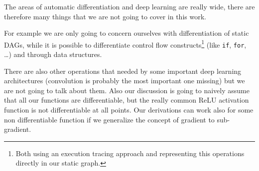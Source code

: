 \documentclass{sapthesis}
\begin{document}
The areas of automatic differentiation and deep learning are really wide, there
are therefore many things that we are not going to cover in this work.

For example we are only going to concern ourselves with differentiation of
static DAGs, while it is possible to differentiate control flow
constructs\footnote{Both using an execution tracing approach and representing
this operations directly in our static graph.} (like \texttt{if}, \texttt{for},
\dots) and through data structures.

There are also other operations that needed by some important deep learning
architectures (convolution is probably the most important one missing) but we
are not going to talk about them. Also our discussion is going to naively assume
that all our functions are differentiable, but the really common ReLU activation
function is not differentiable at all points. Our derivations can work also for
some non differentiable function if we generalize the concept of gradient to
sub-gradient.
\fi %



\end{document}
